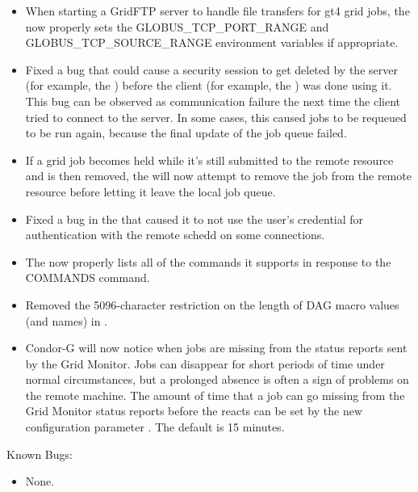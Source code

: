 \begin{itemize}
\item When starting a GridFTP server to handle file transfers for gt4
grid jobs, the  now properly sets the
GLOBUS\_TCP\_PORT\_RANGE and GLOBUS\_TCP\_SOURCE\_RANGE environment
variables if appropriate.

\item Fixed a bug that could cause a security session to get deleted
by the server (for example, the ) before the client
(for example, the ) was done using it.
This bug can be observed as
communication failure the next time the client tried to connect to
the server.  In some cases, this caused jobs to be requeued to be run
again, because the final update of the job queue failed.

\item If a grid job becomes held while it's still submitted to the remote
resource and is then removed, the  will now attempt
to remove the job from the remote resource before letting it leave the
local job queue.

\item Fixed a bug in the  that caused it to not use the 
user's credential for authentication with the remote schedd on some 
connections.

\item The  now properly lists all of the commands it
supports in response to the COMMANDS command.

\item Removed the 5096-character restriction on the length of DAG
macro values (and names) in .

\item Condor-G will now notice when jobs are missing from the status
reports sent by the Grid Monitor.
Jobs can disappear for short periods of time under normal circumstances,
but a prolonged absence is often a sign of problems on the remote machine.
The amount of time that a job can go missing from the Grid Monitor
status reports before the  reacts can be set by the
new configuration parameter .
The default is 15 minutes.

\end{itemize}

\noindent Known Bugs:

\begin{itemize}

\item None.

\end{itemize}


